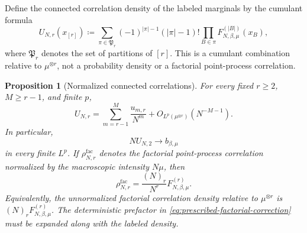 \documentclass[11pt,reqno]{amsart}
\numberwithin{equation}{section}
\theoremstyle{plain}
\newtheorem{prop}[prop]{Proposition}
\theoremstyle{definition}
\newcommand{\be}{\beta}
\newcommand{\Part}{\mathfrak P}
\begin{document}
Define the connected correlation density of the labeled marginals by the cumulant formula
\begin{equation}
 U_{N,r}(x_{[r]})
 \coloneqq\sum_{\pi\in\Part_r}
 (-1)^{|\pi|-1}(|\pi|-1)!
 \prod_{B\in\pi}F_{N,\be,\mu}^{(|B|)}(x_B),
 \label{eq:prescribed-connected-density}
\end{equation}
where $\Part_r$ denotes the set of partitions of $[r]$. This is a cumulant combination relative to $\mu^{\otimes r}$, not a probability density or a factorial point-process correlation.

\begin{prop}[Normalized connected correlations]
\label{prop:prescribed-cluster-expansion}
For every fixed $r\geq2$, $M\geq r-1$, and finite $p$,
\begin{equation}
 U_{N,r}
 =\sum_{m=r-1}^{M}\frac{u_{m,r}}{N^m}
 +O_{L^p(\mu^{\otimes r})}(N^{-M-1}).
 \label{eq:prescribed-cluster-expansion}
\end{equation}
In particular,
\begin{equation}
 NU_{N,2}\longrightarrow b_{\be,\mu}
 \label{eq:prescribed-pair-connected-limit}
\end{equation}
in every finite $L^p$.  If $\rho_{N,r}^{\mathrm{fac}}$ denotes the factorial point-process correlation normalized by the macroscopic intensity $N\mu$, then
\begin{equation}
 \rho_{N,r}^{\mathrm{fac}}
 =\frac{(N)_r}{N^r}F_{N,\be,\mu}^{(r)}.
 \label{eq:prescribed-factorial-correction}
\end{equation}
Equivalently, the unnormalized factorial correlation density relative to $\mu^{\otimes r}$ is $(N)_rF_{N,\be,\mu}^{(r)}$.  The deterministic prefactor in \eqref{eq:prescribed-factorial-correction} must be expanded along with the labeled density.
\end{prop}
\end{document}

